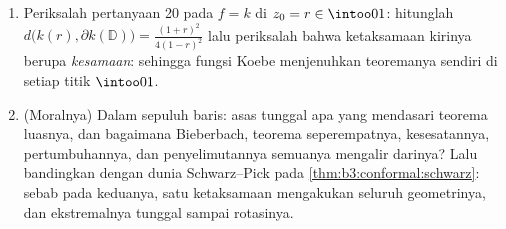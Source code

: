\begin{problem}
\begin{enumerate}[resume]
        $\mathbb D$, yang tak harus ternormalkan, dan $z_0
        \in \mathbb D$. Buktikan bahwa
        \[
        \tfrac14\bigl(1 - \abs{z_0}^2\bigr)\abs{f'(z_0)}
        \;\leq\;
        d\bigl(f(z_0), \partial f(\mathbb D)\bigr)
        \;\leq\;
        \bigl(1 - \abs{z_0}^2\bigr)\abs{f'(z_0)}
        \]
        \emph{(untuk yang kiri: pakailah teorema seperempat yang diterapkan pada transformasi
        Koebe pertanyaan 10; sedangkan untuk yang kanan: Schwarz
        (\cref{thm:b3:conformal:schwarz}) yang diterapkan pada
        $\psi^{-1}\circ\hat g$, dengan $\hat g(w) =
        f^{-1}\bigl(f(z_0) + dw\bigr)$, $d$ jaraknya,
        dan $\psi$ sebuah automorfisma cakram yang mengirim $0$ ke
        $z_0$)}. Lalu mengapa $\partial f(\mathbb D)$ tak kosong?
  \item Periksalah pertanyaan 20 pada $f = k$ di $z_0 = r \in
        \intoo01$: hitunglah $d\bigl(k(r), \partial k(\mathbb
        D)\bigr) = \frac{(1+r)^2}{4(1-r)^2}$ lalu periksalah bahwa
        ketaksamaan kirinya berupa \emph{kesamaan}: sehingga fungsi
        Koebe menjenuhkan teoremanya sendiri di setiap titik
        $\intoo01$.
  \item (Moralnya) Dalam sepuluh baris: asas tunggal apa yang
        mendasari teorema luasnya, dan bagaimana Bieberbach,
        teorema seperempatnya, kesesatannya, pertumbuhannya, dan
        penyelimutannya semuanya mengalir darinya? Lalu bandingkan dengan
        dunia Schwarz--Pick pada
        \cref{thm:b3:conformal:schwarz}: sebab pada keduanya, satu
        ketaksamaan  mengakukan seluruh geometrinya,
        dan ekstremalnya tunggal sampai rotasinya.


\end{enumerate}
\end{problem}
